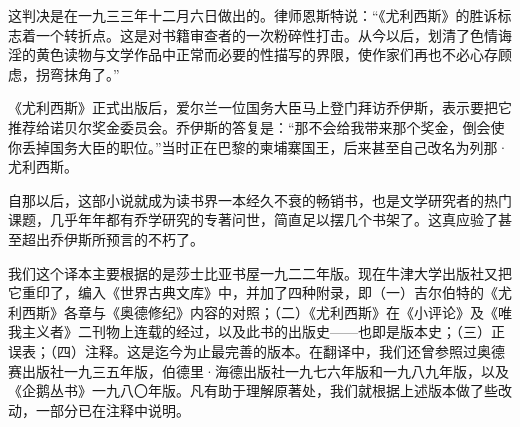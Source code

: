 \par 这判决是在一九三三年十二月六日做出的。律师恩斯特说：“《尤利西斯》的胜诉标志着一个转折点。这是对书籍审查者的一次粉碎性打击。从今以后，划清了色情诲淫的黄色读物与文学作品中正常而必要的性描写的界限，使作家们再也不必心存顾虑，拐弯抹角了。”
\par 《尤利西斯》正式出版后，爱尔兰一位国务大臣马上登门拜访乔伊斯，表示要把它推荐给诺贝尔奖金委员会。乔伊斯的答复是：“那不会给我带来那个奖金，倒会使你丢掉国务大臣的职位。”当时正在巴黎的柬埔寨国王，后来甚至自己改名为列那·尤利西斯。
\par 自那以后，这部小说就成为读书界一本经久不衰的畅销书，也是文学研究者的热门课题，几乎年年都有乔学研究的专著问世，简直足以摆几个书架了。这真应验了甚至超出乔伊斯所预言的不朽了。
\par 我们这个译本主要根据的是莎士比亚书屋一九二二年版。现在牛津大学出版社又把它重印了，编入《世界古典文库》中，并加了四种附录，即（一）吉尔伯特的《尤利西斯》各章与《奥德修纪》内容的对照；（二）《尤利西斯》在《小评论》及《唯我主义者》二刊物上连载的经过，以及此书的出版史——也即是版本史；（三）正误表；（四）注释。这是迄今为止最完善的版本。在翻译中，我们还曾参照过奥德赛出版社一九三五年版，伯德里·海德出版社一九七六年版和一九八九年版，以及《企鹅丛书》一九八〇年版。凡有助于理解原著处，我们就根据上述版本做了些改动，一部分已在注释中说明。

